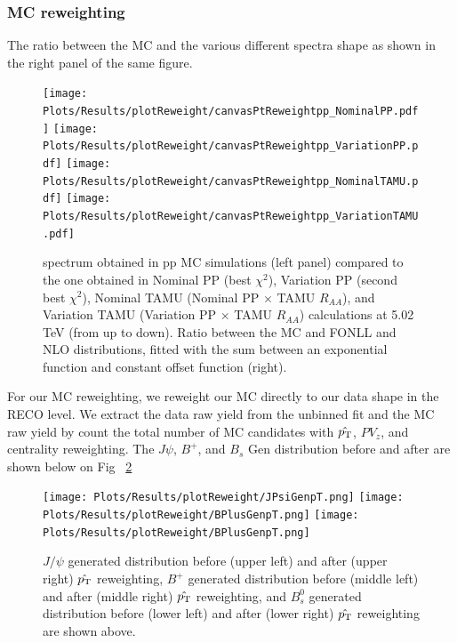 \clearpage

\subsubsection{MC reweighting}
\label{sec:mcreweighting}


The ratio between the MC and the various different spectra shape as shown in the right panel of the same figure. 

\begin{figure}[h]
\begin{center}
\texttt{[image: Plots/Results/plotReweight/canvasPtReweightpp\_NominalPP.pdf]}
\texttt{[image: Plots/Results/plotReweight/canvasPtReweightpp\_VariationPP.pdf]}
\texttt{[image: Plots/Results/plotReweight/canvasPtReweightpp\_NominalTAMU.pdf]}
\texttt{[image: Plots/Results/plotReweight/canvasPtReweightpp\_VariationTAMU.pdf]}
\caption{ \PBzs \pt spectrum obtained in pp MC simulations (left panel) compared to the one obtained in Nominal PP (best $\chi^2$), Variation PP (second best $\chi^2$), Nominal TAMU (Nominal PP $\times$ TAMU $R_{AA}$), and Variation TAMU (Variation PP $\times$ TAMU $R_{AA}$)  calculations at 5.02 TeV (from up to down). 
Ratio between the MC and FONLL and NLO distributions, fitted with the sum between an exponential function and constant offset function (right).}
\label{fig:datamc-genpt-pp}
\end{center}
\end{figure}
\fi





For our MC reweighting, we reweight our MC directly to our data shape in the RECO level. We extract the data raw yield from the unbinned fit and the MC raw yield by count the total number of MC candidates with $\hat {p_{\mathrm{T}}}$, $PV_z$, and centrality reweighting. The $J\psi$, $B^+$, and $B_s$ Gen \pt distribution before and after are shown below on Fig ~\ref{fig:pthatWeightPlot} 

\begin{figure}[h]
\begin{center}
\texttt{[image: Plots/Results/plotReweight/JPsiGenpT.png]}
\texttt{[image: Plots/Results/plotReweight/BPlusGenpT.png]}
\texttt{[image: Plots/Results/plotReweight/BPlusGenpT.png]}
\caption{ $J/\psi$ generated \pt distribution before (upper left) and after (upper right) $\hat {p_{\mathrm{T}}}$ reweighting, $B^+$ generated \pt distribution before (middle left) and after (middle right) $\hat {p_{\mathrm{T}}}$ reweighting, and $B_s^0$ generated \pt distribution before (lower left) and after (lower right) $\hat {p_{\mathrm{T}}}$ reweighting are shown above.}
\label{fig:pthatWeightPlot}
\end{center}
\end{figure}

